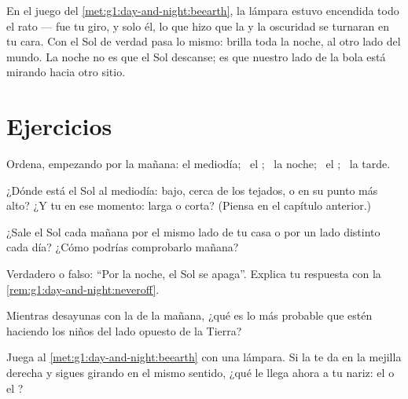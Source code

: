 \begin{remark}\label{rem:g1:day-and-night:neveroff}
En el juego del \cref{met:g1:day-and-night:beearth}, la lámpara
estuvo encendida todo el rato --- fue tu giro, y solo él, lo que hizo
que la  y la oscuridad se turnaran en tu cara. Con el Sol de
verdad pasa lo mismo: brilla toda la noche, al otro lado del mundo. La
noche no es que el Sol descanse; es que nuestro lado de la bola está
mirando hacia otro sitio.
\end{remark}

\section{Ejercicios}

\begin{exercise}[$\star$]\label{exo:g1:day-and-night:1}
Ordena, empezando por la mañana: el mediodía; \ el ; \ la
noche; \ el ; \ la tarde.
\end{exercise}

\begin{exercise}[$\star$]\label{exo:g1:day-and-night:2}
¿Dónde está el Sol al mediodía: bajo, cerca de los tejados, o en su
punto más alto? ¿Y tu  en ese momento: larga o corta? (Piensa
en el capítulo anterior.)
\end{exercise}

\begin{exercise}[$\star$]\label{exo:g1:day-and-night:3}
¿Sale el Sol cada mañana por el mismo lado de tu casa o por un lado
distinto cada día? ¿Cómo podrías comprobarlo mañana?
\end{exercise}

\begin{exercise}[$\star$]\label{exo:g1:day-and-night:4}
Verdadero o falso: ``Por la noche, el Sol se apaga''. Explica tu
respuesta con la \cref{rem:g1:day-and-night:neveroff}.
\end{exercise}

\begin{exercise}[$\star$]\label{exo:g1:day-and-night:5}
Mientras desayunas con la  de la mañana, ¿qué es lo más probable
que estén haciendo los niños del lado opuesto de la Tierra?
\end{exercise}

\begin{exercise}[$\star$]\label{exo:g1:day-and-night:6}
Juega al \cref{met:g1:day-and-night:beearth} con una lámpara. Si la
 te da en la mejilla derecha y sigues girando en el mismo
sentido, ¿qué le llega ahora a tu nariz: el  o el
?
\end{exercise}

